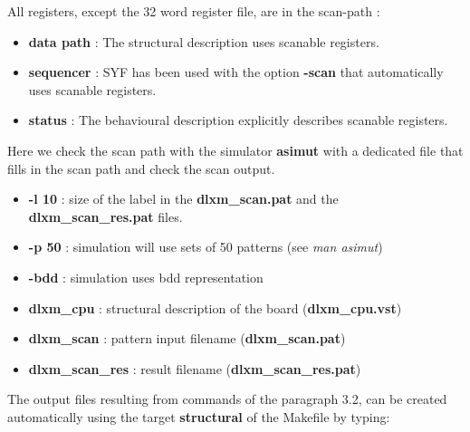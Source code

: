 All registers, except the 32 word register file, are in the scan-path :

\begin{itemize}
\item
{\bf data path }: The structural description uses scanable registers.
\item
{\bf sequencer }: SYF has been used with the option {\bf -scan} that automatically uses scanable registers.
\item
{\bf status }: The behavioural description explicitly describes scanable registers.
\end{itemize}

Here we check the scan path with the simulator {\bf asimut} with a
dedicated file that fills in the scan path and check the scan output.


\begin{itemize}
\item
{\bf -l 10} : size of the label in the {\bf dlxm\_scan.pat} and the {\bf
dlxm\_scan\_res.pat} files.
\item 
{\bf -p 50} : simulation will use sets of 50 patterns (see {\it man
asimut})
\item
{\bf -bdd} : simulation uses bdd representation
\item
{\bf dlxm\_cpu} : structural description of the board ({\bf dlxm\_cpu.vst})
\item
{\bf dlxm\_scan} : pattern input filename ({\bf dlxm\_scan.pat})
\item
{\bf dlxm\_scan\_res } : result filename ({\bf dlxm\_scan\_res.pat})
\end{itemize}

The output files resulting from commands of the paragraph 3.2, can be created automatically using the target {\bf structural} of the Makefile by typing:

